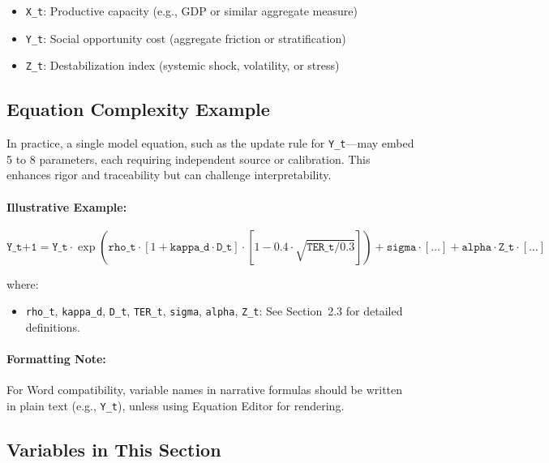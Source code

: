 \documentclass[12pt]{report}
\begin{document}
\vspace{0.3em}
\noindent
\begin{itemize}
  \item \texttt{X\_t}: Productive capacity (e.g., GDP or similar aggregate measure)
  \item \texttt{Y\_t}: Social opportunity cost (aggregate friction or stratification)
  \item \texttt{Z\_t}: Destabilization index (systemic shock, volatility, or stress)
\end{itemize}


\subsection{Equation Complexity Example}

In practice, a single model equation, such as the update rule for \texttt{Y\_t}—may embed 5 to 8 parameters, each requiring independent source or calibration. This enhances rigor and traceability but can challenge interpretability.

\paragraph{Illustrative Example:}
\begin{equation}
\texttt{Y\_t+1} = \texttt{Y\_t} \cdot \exp\left( \texttt{rho\_t} \cdot \left[1 + \texttt{kappa\_d} \cdot \texttt{D\_t} \right] \cdot \left[1 - 0.4 \cdot \sqrt{ \texttt{TER\_t} / 0.3 } \right] \right) + \texttt{sigma} \cdot [\ldots] + \texttt{alpha} \cdot \texttt{Z\_t} \cdot [\ldots]
\end{equation}

\noindent where:
\begin{itemize}
  \item \texttt{rho\_t}, \texttt{kappa\_d}, \texttt{D\_t}, \texttt{TER\_t}, \texttt{sigma}, \texttt{alpha}, \texttt{Z\_t}: See Section~2.3 for detailed definitions.
\end{itemize}

\paragraph{Formatting Note:}
For Word compatibility, variable names in narrative formulas should be written in plain text (e.g., \texttt{Y\_t}), unless using Equation Editor for rendering.

\subsection*{Variables in This Section}
\end{document}
